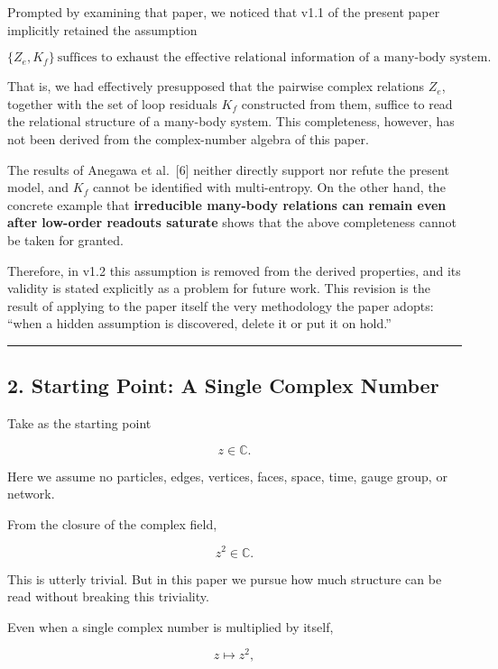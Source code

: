 \documentclass[
  a4paper,
]{article}
\begin{document}
Prompted by examining that paper, we noticed that v1.1 of the present
paper implicitly retained the assumption

\[
\boxed{\{Z_e,K_f\}\ \text{suffices to exhaust the effective relational information of a many-body system.}}
\]

That is, we had effectively presupposed that the pairwise complex
relations \(Z_e\), together with the set of loop residuals \(K_f\)
constructed from them, suffice to read the relational structure of a
many-body system. This completeness, however, has not been derived from
the complex-number algebra of this paper.

The results of Anegawa et al.~{[}6{]} neither directly support nor
refute the present model, and \(K_f\) cannot be identified with
multi-entropy. On the other hand, the concrete example that
\textbf{irreducible many-body relations can remain even after low-order
readouts saturate} shows that the above completeness cannot be taken for
granted.

Therefore, in v1.2 this assumption is removed from the derived
properties, and its validity is stated explicitly as a problem for
future work. This revision is the result of applying to the paper itself
the very methodology the paper adopts: ``when a hidden assumption is
discovered, delete it or put it on hold.''

\begin{center}\rule{0.5\linewidth}{0.5pt}\end{center}

\subsection{2. Starting Point: A Single Complex
Number}\label{starting-point-a-single-complex-number}

Take as the starting point

\[
z\in\mathbb C.
\]

Here we assume no particles, edges, vertices, faces, space, time, gauge
group, or network.

From the closure of the complex field,

\[
z^2\in\mathbb C.
\]

This is utterly trivial. But in this paper we pursue how much structure
can be read without breaking this triviality.

Even when a single complex number is multiplied by itself,

\[
z\mapsto z^2,
\]
\end{document}
